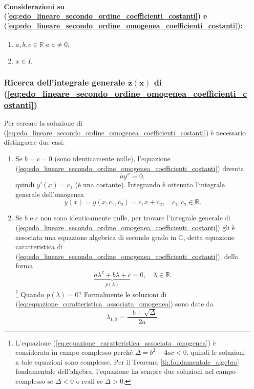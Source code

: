 \paragraph{Considerazioni su (\ref{eq:edo_lineare_secondo_ordine_coefficienti_costanti}) e (\ref{eq:edo_lineare_secondo_ordine_omogenea_coefficienti_costanti}):}
\begin{enumerate}
	\item $a,b,c \in\mathbb{R}$ e $a\neq 0$,
	\item $x\in I$.
\end{enumerate}

\subsubsection{Ricerca dell'integrale generale \texorpdfstring{$\boldsymbol{\bar z(x)}$}{z(x)} di (\ref{eq:edo_lineare_secondo_ordine_omogenea_coefficienti_costanti})}
Per cercare la soluzione di (\ref{eq:edo_lineare_secondo_ordine_omogenea_coefficienti_costanti}) è necessario distinguere due casi:
\begin{enumerate}
	\item Se $b=c=0$ (sono identicamente nulle), l'equazione (\ref{eq:edo_lineare_secondo_ordine_omogenea_coefficienti_costanti}) diventa
	\begin{equation*}
		a y''=0,
	\end{equation*}
	quindi $y'(x)=c_1$ (è una costante). Integrando è ottenuto l'integrale generale dell'omogenea
	\begin{equation*}
		y(x)=y(x,c_1,c_2) 
		= c_1 x+c_2,\quad c_1,c_2\in\mathbb{R}.
	\end{equation*}
	\item Se $b$ e $c$ non sono identicamente nulle, per trovare l'integrale generale di (\ref{eq:edo_lineare_secondo_ordine_omogenea_coefficienti_costanti}) gli è associata una equazione algebrica di secondo grado in $\mathbb{C}$, detta equazione caratteristica di (\ref{eq:edo_lineare_secondo_ordine_omogenea_coefficienti_costanti}), della forma
	\begin{equation}\label{eq:equazione_caratteristica_associata_omogenea}
		\underbrace{a\lambda^2 + b\lambda + c}_{p(\lambda)} = 0,\quad\lambda\in\mathbb{R}.
	\end{equation}
	\footnote{L'equazione (\ref{eq:equazione_caratteristica_associata_omogenea}) è considerata in campo complesso perché $\Delta = b^2-4ac<0$, quindi le soluzioni a tale equazioni sono complesse. Per il Teorema \ref{th:fondamentale_algebra} fondamentale dell'algebra, l'equazione ha sempre due soluzioni nel campo complesso se $\Delta<0$ o reali se $\Delta>0$.} Quando $p(\lambda)=0$? Formalmente le soluzioni di (\ref{eq:equazione_caratteristica_associata_omogenea}) sono date da
	\begin{equation*}
		\lambda_{1,2} = \frac{-b\pm\sqrt{\Delta}}{2a}.
	\end{equation*}
\end{enumerate}

